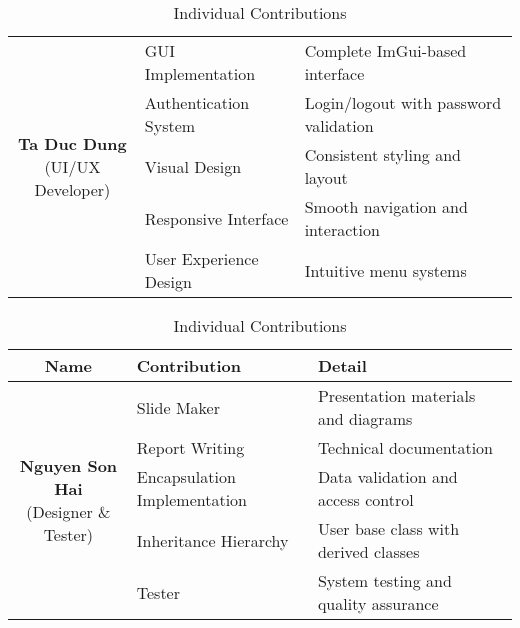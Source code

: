\begin{center}
\begin{table}[H]
\begin{tabularx}{\textwidth}{| c | l | X |}
			\multirow{5}{*}{\parbox{3.5cm}{\centering\textbf{Ta Duc Dung}                                       \\ \small{(UI/UX Developer)}}}
			              & GUI Implementation          & Complete ImGui-based interface                        \\
			\cline{2-3}
			              & Authentication System       & Login/logout with password validation                 \\
			\cline{2-3}
			              & Visual Design               & Consistent styling and layout                         \\
			\cline{2-3}
			              & Responsive Interface        & Smooth navigation and interaction                     \\
			\cline{2-3}
			              & User Experience Design      & Intuitive menu systems                                \\
			\hline
		\end{tabularx}
		\caption{Individual Contributions}
	\end{table}
\end{center}

\newpage

\begin{center}
	\begin{table}[H]
		\renewcommand{\arraystretch}{1.5}
		\setlength{\tabcolsep}{8pt}

		\begin{tabularx}{\textwidth}{| c | l | X |}
			\hline
			\rowcolor{gray!30}
			\textbf{Name} & \textbf{Contribution}       & \textbf{Detail}                                       \\
			\hline

			\multirow{5}{*}{\parbox{3.5cm}{\centering\textbf{Nguyen Son Hai}                                    \\ \small{(Designer \& Tester)}}}
			              & Slide Maker                 & Presentation materials and diagrams                   \\
			\cline{2-3}
			              & Report Writing              & Technical documentation                               \\
			\cline{2-3}
			 & Encapsulation Implementation & Data validation and access control \\
			\cline{2-3}
			 & Inheritance Hierarchy & User base class with derived classes \\
			\cline{2-3}
			              & Tester                      & System testing and quality assurance                  \\
			\hline
		\end{tabularx}
		\caption{Individual Contributions}
	\end{table}
\end{center}

